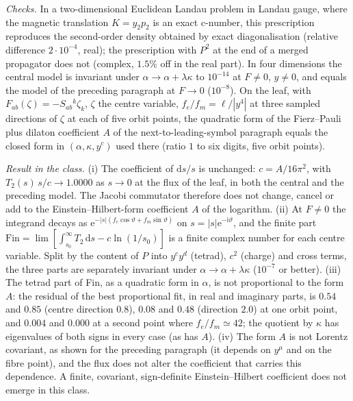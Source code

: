 \emph{Checks.} In a two-dimensional Euclidean Landau problem in Landau gauge, where the magnetic translation \(K=y_2p_2\) is an exact c-number, this prescription reproduces the second-order density obtained by exact diagonalisation (relative difference \(2\cdot10^{-4}\), real); the prescription with \(P^2\) at the end of a merged propagator does not (complex, \(1.5\%\) off in the real part). In four dimensions the central model is invariant under \(\alpha\to\alpha+\lambda\kappa\) to \(10^{-14}\) at \(F\ne0\), \(y\ne0\), and equals the model of the preceding paragraph at \(F\to0\) (\(10^{-8}\)). On the leaf, with \(F_{ab}(\zeta)=-S_{ab}{}^k\zeta_k\), \(\zeta\) the centre variable, \(f_e/f_m=\ell/|y^4|\) at three sampled directions of \(\zeta\) at each of five orbit points, the quadratic form of the Fierz--Pauli plus dilaton coefficient \(A\) of the next-to-leading-symbol paragraph equals the closed form in \((\alpha,\kappa,y^c)\) used there (ratio \(1\) to six digits, five orbit points).

\emph{Result in the class.} (i) The coefficient of \(\mathrm ds/s\) is unchanged: \(c=A/16\pi^2\), with \(T_2(s)\,s/c\to1.0000\) as \(s\to0\) at the flux of the leaf, in both the central and the preceding model. The Jacobi commutator therefore does not change, cancel or add to the Einstein--Hilbert-form coefficient \(A\) of the logarithm. (ii) At \(F\ne0\) the integrand decays as \(\mathrm e^{-|s|(f_e\cos\vartheta+f_m\sin\vartheta)}\) on \(s=|s|\mathrm e^{-\mathrm i\vartheta}\), and the finite part \(\mathrm{Fin}=\lim[\int_{s_0}^\infty T_2\,\mathrm ds-c\ln(1/s_0)]\) is a finite complex number for each centre variable. Split by the content of \(P\) into \(y^cy^d\) (tetrad), \(c^2\) (charge) and cross terms, the three parts are separately invariant under \(\alpha\to\alpha+\lambda\kappa\) (\(10^{-7}\) or better). (iii) The tetrad part of Fin, as a quadratic form in \(\alpha\), is not proportional to the form \(A\): the residual of the best proportional fit, in real and imaginary parts, is \(0.54\) and \(0.85\) (centre direction \(0.8\)), \(0.08\) and \(0.48\) (direction \(2.0\)) at one orbit point, and \(0.004\) and \(0.000\) at a second point where \(f_e/f_m\simeq42\); the quotient by \(\kappa\) has eigenvalues of both signs in every case (as has \(A\)). (iv) The form \(A\) is not Lorentz covariant, as shown for the preceding paragraph (it depends on \(y^\mu\) and on the fibre point), and the flux does not alter the coefficient that carries this dependence. A finite, covariant, sign-definite Einstein--Hilbert coefficient does not emerge in this class.

